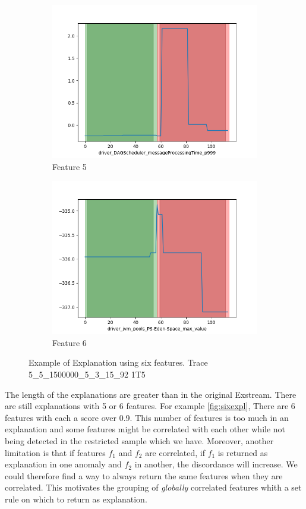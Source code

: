 \documentclass[oneside, a4paper, onecolumn, 11pt]{article}
\begin{document}
\begin{figure}[H]
\begin{subfigure}{0.30\textwidth}
  \includegraphics[width=\linewidth]{images/ex5.png}
  \caption{Feature 5}
\end{subfigure}
\begin{subfigure}{0.30\textwidth}
  \centering
  \includegraphics[width=\linewidth]{images/ex6.png}
  \caption{Feature 6}
\end{subfigure}
  \caption{Example of Explanation using six features. Trace 5\_5\_1500000\_5\_3\_15\_92 1T5}
  \label{fig:sixexpl}
\end{figure}
The length of the explanations are greater than in the original Exstream. There are still explanations with 5 or 6 features. For example \autoref{fig:sixexpl}, There are 6 features with each a score over 0.9. This number of features is too much in an explanation and some features might be correlated with each other while not being detected in the restricted sample which we have. Moreover, another limitation is that if features $f_1$ and $f_2$ are correlated, if $f_1$ is returned as explanation in one anomaly and $f_2$ in another, the discordance will increase. We could therefore find a way to always return the same features when they are correlated. This motivates the grouping of \textit{globally} correlated features whith a set rule on which to return as explanation.\\\\
\end{document}
